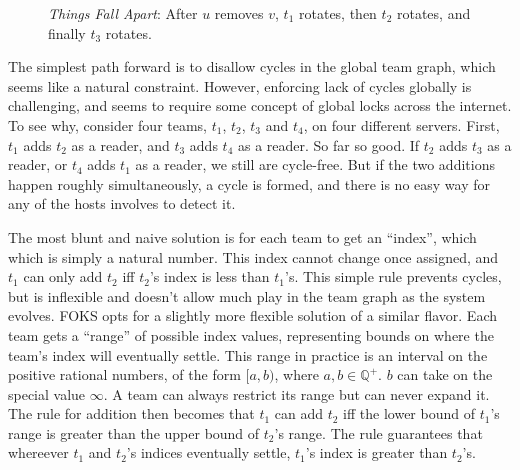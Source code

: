 \begin{figure}[ht]
    \centering
    \caption{\textit{Things Fall Apart}: After $u$ removes $v$, $t_1$ rotates, then $t_2$ rotates, and finally $t_3$ rotates.}
    \label{fig:cycle4}
\end{figure}

The simplest path forward is to disallow cycles in the global team
graph, which seems like a natural constraint. However, enforcing
lack of cycles globally is challenging, and seems to require some
concept of global locks across the internet. To see why, consider
four teams, $t_1$, $t_2$, $t_3$ and $t_4$, on four different servers.
First, $t_1$ adds $t_2$ as a reader, and $t_3$ adds $t_4$ as a reader.
So far so good. If $t_2$ adds $t_3$ as a reader, or $t_4$ adds
$t_1$ as a reader, we still are cycle-free.  But if the two additions
happen roughly simultaneously, a cycle is formed, and there is no easy
way for any of the hosts involves to detect it.

The most blunt and naive solution is for each team to get an ``index'', which
which is simply a natural number. This index cannot change once assigned, and
$t_1$ can only add $t_2$ iff $t_2$'s index is less than $t_1$'s. This simple
rule prevents cycles, but is inflexible and doesn't allow much play in the team
graph as the system evolves. FOKS opts for a slightly more flexible solution of
a similar flavor. Each team gets a ``range'' of possible index values,
representing bounds on where the team's index will eventually settle.  This
range in practice is an interval on the positive rational numbers, of the form
$[a,b)$, where $a,b \in \mathbb{Q^{+}}$. $b$ can take on the special value $\infty$.
A team can always restrict its range but can never expand it. The rule for
addition then becomes that $t_1$ can add $t_2$ iff the lower bound of $t_1$'s
range is greater than the upper bound of $t_2$'s range. The rule guarantees that
whereever $t_1$ and $t_2$'s indices eventually settle, $t_1$'s index is greater
than $t_2$'s.

